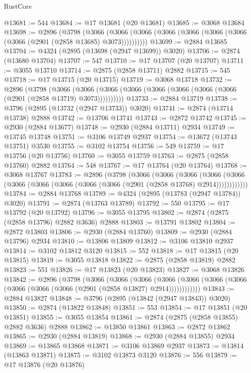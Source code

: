\begin{lexlean}{RustCore}
\begin{coremodule}
@13681 := 544
@13684 := @17 @13681 (@20 @13681)
@13685 := @3068 @13684
@13698 := @2896
    (@3798
      (@3066 (@3066 (@3066 (@3066 (@3066 (@3066 (@3066 (@3066 (@2901 (@2858 @13685) @3073))))))))))
@13699 := @2884 @13685
@13704 := @4324 (@2895 (@13698 (@2947 @13699)) @3020)
@13706 := @2874 (@13680 @13704)
@13707 := 547
@13710 := @17 @13707 (@20 @13707)
@13711 := @3055 @13710
@13714 := @2875 (@2858 @13711) @2882
@13715 := 545
@13718 := @17 @13715 (@20 @13715)
@13719 := @3068 @13718
@13732 := @2896
    (@3798
      (@3066 (@3066 (@3066 (@3066 (@3066 (@3066 (@3066 (@3066 (@2901 (@2858 @13719) @3073))))))))))
@13733 := @2884 @13719
@13738 := @3796 (@2895 (@13732 (@2947 @13733)) @3020)
@13741 := @2874 (@13714 @13738) @2888
@13742 := @13706 @13741
@13743 := @2872 @13742
@13745 := @2930 (@2884 @13677)
@13748 := @2930 (@2884 @13711) @2934
@13749 := @13745 @13748
@13751 := @3106 @13749 @2937
@13754 := @13672 (@13743 @13751) @3530
@13755 := @3102 @13754
@13756 := 549
@13759 := @17 @13756 (@20 @13756)
@13760 := @3055 @13759
@13763 := @2875 (@2858 @13760) @2882
@13764 := 548
@13767 := @17 @13764 (@20 @13764)
@13768 := @3068 @13767
@13783 := @2896
    (@3798
      (@3066
        (@3066
          (@3066
            (@3066 (@3066 (@3066 (@3066 (@3066 (@3066 (@3066 (@2901 (@2858 @13768) @2914))))))))))))
@13784 := @2884 @13768
@13789 := @4324 (@2895 (@13783 (@2947 @13784)) @3020)
@13791 := @2874 (@13763 @13789)
@13792 := 550
@13795 := @17 @13792 (@20 @13792)
@13796 := @3055 @13795
@13802 := @2874 (@2875 (@2858 @13796) @2882 @3636) @2888
@13803 := @13791 @13802
@13804 := @2872 @13803
@13806 := @2930 (@2884 @13760)
@13809 := @2930 (@2884 @13796) @2934
@13810 := @13806 @13809
@13812 := @3106 @13810 @2937
@13814 := @3102 @13812 @3120
@13815 := 552
@13818 := @17 @13815 (@20 @13815)
@13819 := @3055 @13818
@13822 := @2875 (@2858 @13819) @2882
@13823 := 551
@13826 := @17 @13823 (@20 @13823)
@13827 := @3068 @13826
@13842 := @2896
    (@3798
      (@3066
        (@3066
          (@3066
            (@3066 (@3066 (@3066 (@3066 (@3066 (@3066 (@3066 (@2901 (@2858 @13827) @2914))))))))))))
@13843 := @2884 @13827
@13848 := @3796 (@2895 (@13842 (@2947 @13843)) @3020)
@13850 := @2874 (@13822 @13848)
@13851 := 553
@13854 := @17 @13851 (@20 @13851)
@13855 := @3055 @13854
@13861 := @2874 (@2875 (@2858 @13855) @2882 @3636) @2888
@13862 := @13850 @13861
@13863 := @2872 @13862
@13865 := @2930 (@2884 @13819)
@13868 := @2930 (@2884 @13855) @2934
@13869 := @13865 @13868
@13871 := @3106 @13869 @2937
@13873 := @13814 (@13863 @13871)
@13875 := @3102 @13873 @3120
@13876 := 556
@13879 := @17 @13876 (@20 @13876)

\end{coremodule}
\end{lexlean}
